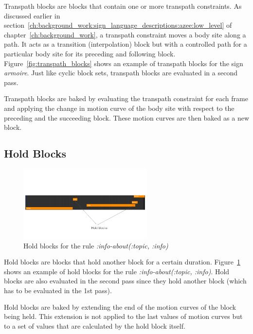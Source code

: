 \documentclass[../../main.tex]{subfiles}
\begin{document}
Transpath blocks are blocks that contain one or more transpath constraints. As discussed earlier in section~\ref{ch:background_work:sign_language_descriptions:azee:low_level} of chapter~\ref{ch:background_work}, a transpath constraint moves a body site along a path. It acts as a transition (interpolation) block but with a controlled path for a particular body site for its preceding and following block. Figure~\ref{fig:transpath_blocks} shows an example of transpath blocks for the sign \emph{armoire}. Just like cyclic block sets, transpath blocks are evaluated in a second pass.

Transpath blocks are baked by evaluating the transpath constraint for each frame and applying the change in motion curve of the body site with respect to the preceding and the succeeding block. These motion curves are then baked as a new block.

\subsection{Hold Blocks}
\label{ch:multi_track:second_pass:hold_blocks}

\begin{figure}[H]
    \centering
    \includegraphics[width=0.6\textwidth]{chapters/multi_track/images/hold_blocks.png}
    \caption{Hold blocks for the rule \emph{:info-about(:topic, :info)}}
    \label{fig:hold_blocks}
\end{figure}

Hold blocks are blocks that hold another block for a certain duration. Figure~\ref{fig:hold_blocks} shows an example of hold blocks for the rule \emph{:info-about(:topic, :info)}. Hold blocks are also evaluated in the second pass since they hold another block (which has to be evaluated in the 1st pass).

Hold blocks are baked by extending the end of the motion curves of the block being held. This extension is not applied to the last values of motion curves but to a set of values that are calculated by the hold block itself.
\end{document}
